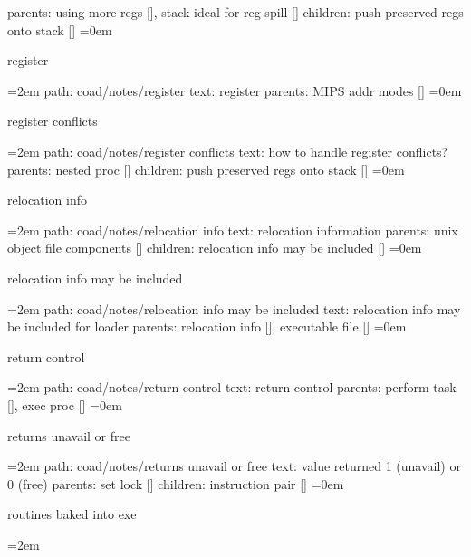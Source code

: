 \smallskip
parents:  using more regs [], stack ideal for reg spill []
\smallskip
children: push preserved regs onto stack []
\smallskip
\leftskip=0em
\par\endgroup
\bigskip
{}
register
\smallskip
\par\begingroup
\leftskip=2em
path: coad/notes/register
\smallskip
text:  register
\smallskip
parents:  MIPS addr modes []
\smallskip
\leftskip=0em
\par\endgroup
\bigskip
{}
register conflicts
\smallskip
\par\begingroup
\leftskip=2em
path: coad/notes/register conflicts
\smallskip
text:  how to handle register conflicts?
\smallskip
parents:  nested proc []
\smallskip
children: push preserved regs onto stack []
\smallskip
\leftskip=0em
\par\endgroup
\bigskip
{}
relocation info
\smallskip
\par\begingroup
\leftskip=2em
path: coad/notes/relocation info
\smallskip
text:  relocation information
\smallskip
parents:  unix object file components []
\smallskip
children: relocation info may be included []
\smallskip
\leftskip=0em
\par\endgroup
\bigskip
{}
relocation info may be included
\smallskip
\par\begingroup
\leftskip=2em
path: coad/notes/relocation info may be included
\smallskip
text:  relocation info may be included for loader
\smallskip
parents:  relocation info [], executable file []
\smallskip
\leftskip=0em
\par\endgroup
\bigskip
{}
return control
\smallskip
\par\begingroup
\leftskip=2em
path: coad/notes/return control
\smallskip
text:  return control
\smallskip
parents:  perform task [], exec proc []
\smallskip
\leftskip=0em
\par\endgroup
\bigskip
{}
returns unavail or free
\smallskip
\par\begingroup
\leftskip=2em
path: coad/notes/returns unavail or free
\smallskip
text:  value returned 1 (unavail) or 0 (free)
\smallskip
parents:  set lock []
\smallskip
children: instruction pair []
\smallskip
\leftskip=0em
\par\endgroup
\bigskip
{}
routines baked into exe
\smallskip
\par\begingroup
\leftskip=2em
